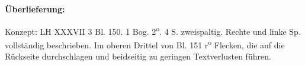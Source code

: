       
               
                \begin{ledgroupsized}[r]{120mm}
                \footnotesize 
                \pstart                
                \noindent\textbf{\"{U}berlieferung:}   
                \pend
                \end{ledgroupsized}
            
              
                            \begin{ledgroupsized}[r]{114mm}
                            \footnotesize 
                            \pstart \parindent -6mm
                            Konzept: LH XXXVII 3 Bl. 150. 1 Bog. 2\textsuperscript{o}. 4 S. zweispaltig. Rechte und linke Sp. vollst\"{a}ndig beschrieben. Im oberen Drittel von Bl. 151 r\textsuperscript{o} Flecken, die auf die R\"{u}ckseite durchschlagen und beidseitig zu geringen Textverlusten f\"{u}hren. \pend
                            \end{ledgroupsized}
              
